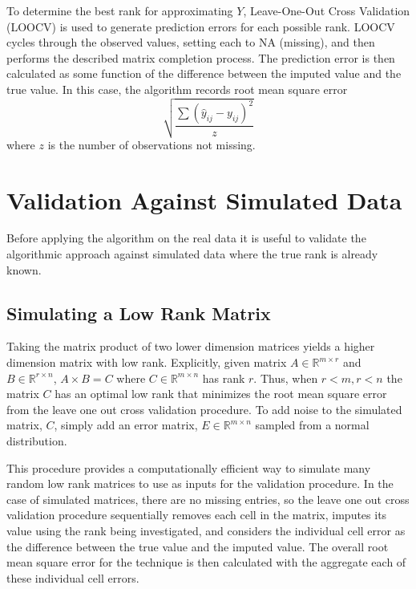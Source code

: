 \documentclass[12pt,twoside]{dukestatscithesis}
\theoremstyle{definition}
\theoremstyle{definition}
\theoremstyle{definition}
\theoremstyle{remark}
\begin{document}
To determine the best rank for approximating \(Y\), Leave-One-Out Cross
Validation (LOOCV) is used to generate prediction errors for each
possible rank. LOOCV cycles through the observed values, setting each to
NA (missing), and then performs the described matrix completion process.
The prediction error is then calculated as some function of the
difference between the imputed value and the true value. In this case,
the algorithm records root mean square error
\[\sqrt{\frac{\sum (\hat y_{ij} - y_{ij})^2}{z}}\] where \(z\) is the
number of observations not missing.

\section{Validation Against Simulated
Data}\label{validation-against-simulated-data}

Before applying the algorithm on the real data it is useful to validate
the algorithmic approach against simulated data where the true rank is
already known.

\subsection{Simulating a Low Rank
Matrix}\label{simulating-a-low-rank-matrix}

Taking the matrix product of two lower dimension matrices yields a
higher dimension matrix with low rank. Explicitly, given matrix
\(A \in \mathbb{R}^{m \times r}\) and \(B \in \mathbb{R}^{r \times n}\),
\(A \times B = C\) where \(C \in \mathbb{R}^{m \times n}\) has rank
\(r\). Thus, when \(r < m, r < n\) the matrix \(C\) has an optimal low
rank that minimizes the root mean square error from the leave one out
cross validation procedure. To add noise to the simulated matrix, \(C\),
simply add an error matrix, \(E \in \mathbb{R}^{m \times n}\) sampled
from a normal distribution.

This procedure provides a computationally efficient way to simulate many
random low rank matrices to use as inputs for the validation procedure.
In the case of simulated matrices, there are no missing entries, so the
leave one out cross validation procedure sequentially removes each cell
in the matrix, imputes its value using the rank being investigated, and
considers the individual cell error as the difference between the true
value and the imputed value. The overall root mean square error for the
technique is then calculated with the aggregate each of these individual
cell errors.
\end{document}
